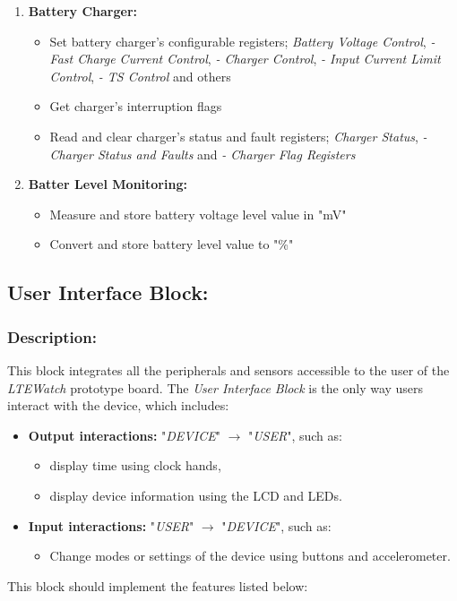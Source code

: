 \documentclass[report.tex]{subfiles}
\begin{document}
\begin{enumerate}
\item \textbf{Battery Charger:}
\begin{itemize}
\item Set battery charger's configurable registers;
\textit{Battery Voltage Control}, \textit{- Fast Charge Current Control}, \textit{- Charger Control}, \textit{- Input Current Limit Control}, \textit{- TS Control} and others
\item Get charger's interruption flags
\item Read and clear charger's status and fault registers; \textit{Charger Status}, \textit{- Charger Status and Faults} and \textit{- Charger Flag Registers }
\end{itemize}
\item \textbf{Batter Level Monitoring:}
\begin{itemize}
\item Measure and store battery voltage level value in "\si{\milli\volt}"
\item Convert and store battery level value to "\si{\percent}"
\end{itemize}
\end{enumerate}

\pagebreak

\subsection{User Interface Block:}
\subsubsection{Description:}
This block integrates all the peripherals and sensors accessible to the user of the \textit{LTEWatch} prototype board. The \textit{User Interface Block} is the only way users interact with the device, which includes:
\begin{itemize}
\item \textbf{Output interactions:} "\textit{DEVICE}" $\rightarrow$ "\textit{USER}", such as:
\begin{itemize}
\item display time using clock hands,
\item display device information using the LCD and LEDs.
\end{itemize}   
\item \textbf{Input interactions:} "\textit{USER}" $\rightarrow$ "\textit{DEVICE}", such as:
\begin{itemize}
\item Change modes or settings of the device using buttons and accelerometer.
\end{itemize}   
\end{itemize}
This block should implement the features listed below:
 
\end{document}
